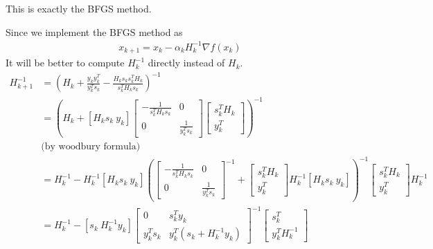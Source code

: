\documentclass[11pt]{elegantbook}
\begin{document}
This is exactly the BFGS method.

Since we implement the BFGS method as
\begin{equation}
    \begin{aligned}
        x_{k+1}=x_k-\alpha_k H_k^{-1}\nabla f(x_k)
    \end{aligned}
    \nonumber
\end{equation}
It will be better to compute $H_{k}^{-1}$ directly instead of $H_k$.
\begin{equation}
    \begin{aligned}
        H_{k+1}^{-1}&=\left(H_k+\frac{y_ky_k^T}{y_k^T s_k}-\frac{H_k s_ks_k^TH_k}{s_k^TH_ks_k}\right)^{-1}\\
        &=\left(H_k+[H_ks_k\ y_k]
        \begin{bmatrix}
            -\frac{1}{s_k^TH_ks_k}&0\\
            0&\frac{1}{y_k^Ts_k}
        \end{bmatrix}
        \begin{bmatrix}
            s_k^TH_k\\
            y_k^T
        \end{bmatrix}\right)^{-1}\\
        &\text{(by woodbury formula)}\\
        &=H_k^{-1}-H_k^{-1}[H_ks_k\ y_k]\left(\begin{bmatrix}
            -\frac{1}{s_k^TH_ks_k}&0\\
            0&\frac{1}{y_k^Ts_k}
        \end{bmatrix}^{-1}+
        \begin{bmatrix}
            s_k^TH_k\\
            y_k^T
        \end{bmatrix}H_k^{-1}[H_ks_k\ y_k]\right)^{-1}\begin{bmatrix}
            s_k^TH_k\\
            y_k^T
        \end{bmatrix}H_k^{-1}\\
        &=H_k^{-1}-[s_k\ H_k^{-1}y_k]\begin{bmatrix}
            0&s_k^Ty_k\\
            y_k^Ts_k&y_k^T(s_k+H_k^{-1}y_k)
        \end{bmatrix}^{-1}\begin{bmatrix}
            s_k^T\\
            y_k^TH_k^{-1}
        \end{bmatrix}\\

\end{aligned}
\end{equation}
\end{document}
